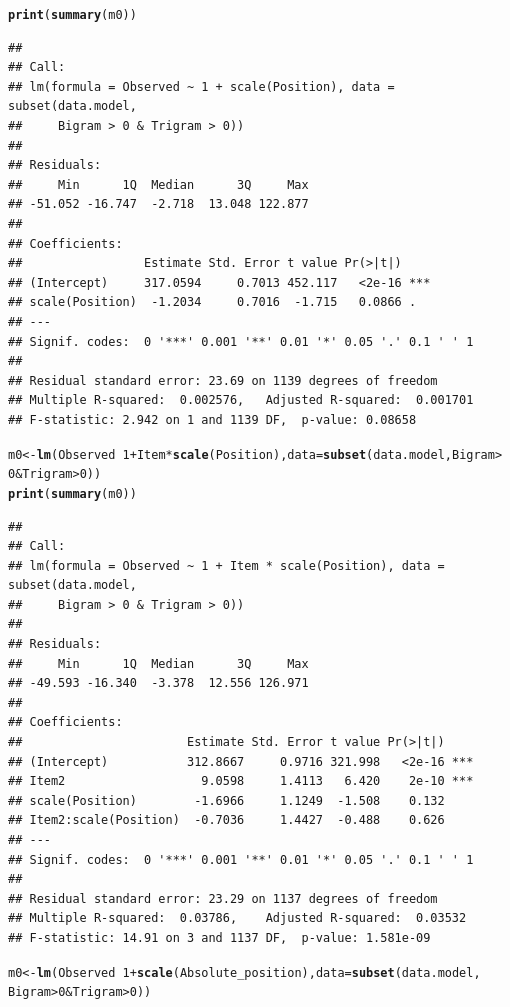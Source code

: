 \documentclass{article}\usepackage[]{graphicx}\usepackage[]{color}
\makeatletter
\newcommand{\hlnum}[1]{\textcolor[rgb]{0.686,0.059,0.569}{#1}}%
\newcommand{\hlopt}[1]{\textcolor[rgb]{0,0,0}{#1}}%
\newcommand{\hlstd}[1]{\textcolor[rgb]{0.345,0.345,0.345}{#1}}%
\newcommand{\hlkwb}[1]{\textcolor[rgb]{0.69,0.353,0.396}{#1}}%
\newcommand{\hlkwc}[1]{\textcolor[rgb]{0.333,0.667,0.333}{#1}}%
\newcommand{\hlkwd}[1]{\textcolor[rgb]{0.737,0.353,0.396}{\textbf{#1}}}%
\newenvironment{kframe}{%
 \def\at@end@of@kframe{}%
 \ifinner\ifhmode%
  \def\at@end@of@kframe{\end{minipage}}%
  \begin{minipage}{\columnwidth}%
 \fi\fi%
 \def\FrameCommand##1{\hskip\@totalleftmargin \hskip-\fboxsep
 \colorbox{shadecolor}{##1}\hskip-\fboxsep
     \hskip-\linewidth \hskip-\@totalleftmargin \hskip\columnwidth}%
 \MakeFramed {\advance\hsize-\width
   \@totalleftmargin\z@ \linewidth\hsize
   \@setminipage}}%
 {\par\unskip\endMakeFramed%
 \at@end@of@kframe}
\newenvironment{knitrout}{}{} %
\makeatother
\begin{document}
\begin{knitrout}
\begin{kframe}
\begin{alltt}
\hlkwd{print}\hlstd{(}\hlkwd{summary}\hlstd{(m0))}
\end{alltt}
\begin{verbatim}
## 
## Call:
## lm(formula = Observed ~ 1 + scale(Position), data = subset(data.model, 
##     Bigram > 0 & Trigram > 0))
## 
## Residuals:
##     Min      1Q  Median      3Q     Max 
## -51.052 -16.747  -2.718  13.048 122.877 
## 
## Coefficients:
##                 Estimate Std. Error t value Pr(>|t|)    
## (Intercept)     317.0594     0.7013 452.117   <2e-16 ***
## scale(Position)  -1.2034     0.7016  -1.715   0.0866 .  
## ---
## Signif. codes:  0 '***' 0.001 '**' 0.01 '*' 0.05 '.' 0.1 ' ' 1
## 
## Residual standard error: 23.69 on 1139 degrees of freedom
## Multiple R-squared:  0.002576,	Adjusted R-squared:  0.001701 
## F-statistic: 2.942 on 1 and 1139 DF,  p-value: 0.08658
\end{verbatim}
\begin{alltt}
\hlstd{m0} \hlkwb{<-} \hlkwd{lm}\hlstd{(Observed} \hlopt{~} \hlnum{1} \hlopt{+} \hlstd{Item} \hlopt{*} \hlkwd{scale}\hlstd{(Position),} \hlkwc{data} \hlstd{=} \hlkwd{subset}\hlstd{(data.model, Bigram} \hlopt{>}
    \hlnum{0} \hlopt{&} \hlstd{Trigram} \hlopt{>} \hlnum{0}\hlstd{))}
\hlkwd{print}\hlstd{(}\hlkwd{summary}\hlstd{(m0))}
\end{alltt}
\begin{verbatim}
## 
## Call:
## lm(formula = Observed ~ 1 + Item * scale(Position), data = subset(data.model, 
##     Bigram > 0 & Trigram > 0))
## 
## Residuals:
##     Min      1Q  Median      3Q     Max 
## -49.593 -16.340  -3.378  12.556 126.971 
## 
## Coefficients:
##                       Estimate Std. Error t value Pr(>|t|)    
## (Intercept)           312.8667     0.9716 321.998   <2e-16 ***
## Item2                   9.0598     1.4113   6.420    2e-10 ***
## scale(Position)        -1.6966     1.1249  -1.508    0.132    
## Item2:scale(Position)  -0.7036     1.4427  -0.488    0.626    
## ---
## Signif. codes:  0 '***' 0.001 '**' 0.01 '*' 0.05 '.' 0.1 ' ' 1
## 
## Residual standard error: 23.29 on 1137 degrees of freedom
## Multiple R-squared:  0.03786,	Adjusted R-squared:  0.03532 
## F-statistic: 14.91 on 3 and 1137 DF,  p-value: 1.581e-09
\end{verbatim}
\begin{alltt}
\hlstd{m0} \hlkwb{<-} \hlkwd{lm}\hlstd{(Observed} \hlopt{~} \hlnum{1} \hlopt{+} \hlkwd{scale}\hlstd{(Absolute_position),} \hlkwc{data} \hlstd{=} \hlkwd{subset}\hlstd{(data.model,}
    \hlstd{Bigram} \hlopt{>} \hlnum{0} \hlopt{&} \hlstd{Trigram} \hlopt{>} \hlnum{0}\hlstd{))}

\end{alltt}
\end{kframe}
\end{knitrout}
\end{document}
